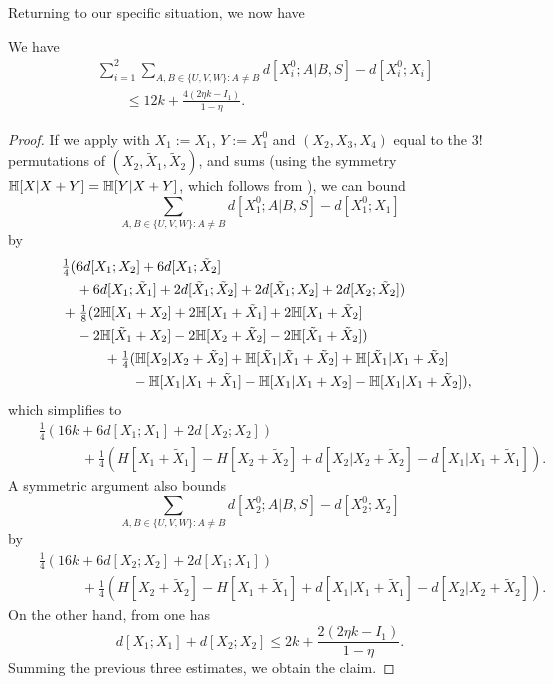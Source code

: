 Returning to our specific situation, we now have

\begin{lemma}\label{dist-diff-bound}\leanok We have
\begin{align*}  &\sum_{i=1}^2 \sum_{A,B \in \{U,V,W\}: A \neq B}  d[X_i^0;A|B, S] - d[X_i^0;X_i]\\
&\qquad \leq 12 k + \frac{4(2 \eta k - I_1)}{1-\eta}.
\end{align*}
\end{lemma}

\begin{proof}\leanok
If we apply  with $X_1:=X_1$, $Y:=X_1^0$ and $(X_2,X_3,X_4)$ equal to the $3!$ permutations of $(X_2,\tilde X_1,\tilde X_2)$, and sums (using the symmetry $\mathbb{H}[X|X+Y] = \mathbb{H}[Y|X+Y]$, which follows from ), we can bound
$$ \sum_{A,B \in \{U,V,W\}: A \neq B}  d[X_1^0;A|B, S] - d[X_1^0;X_1]$$
by
\begin{align*}
  &\quad \tfrac{1}{4} (6d[X_1;X_2] + 6d[X_1;\tilde X_2]\\
  &\qquad + 6d[X_1;\tilde X_1] + 2d[\tilde X_1;\tilde X_2] + 2 d[\tilde X_1;X_2] + 2d[X_2;\tilde X_2])\\
  &\quad + \tfrac{1}{8} (2\mathbb{H}[X_1+X_2] + 2\mathbb{H}[X_1+\tilde X_1] + 2 \mathbb{H}[X_1+\tilde X_2] \\
  &\qquad - 2\mathbb{H}[\tilde X_1+X_2] - 2\mathbb{H}[X_2+\tilde X_2] - 2\mathbb{H}[\tilde X_1+\tilde X_2])\\
  &\qquad \qquad + \tfrac{1}{4} (\mathbb{H}[X_2|X_2+\tilde X_2] + \mathbb{H}[\tilde X_1|\tilde X_1+\tilde X_2] + \mathbb{H}[\tilde X_1|X_1+\tilde X_2] \\
  &\qquad \qquad \qquad - \mathbb{H}[X_1|X_1+\tilde X_1] - \mathbb{H}[X_1|X_1+X_2] - \mathbb{H}[X_1|X_1+\tilde X_2]),
\end{align*}
which simplifies to
\begin{align*}
  &\quad \tfrac{1}{4} (16k + 6d[X_1;X_1] + 2d[X_2;X_2])\\
  &\qquad \qquad + \tfrac{1}{4} (H[X_1+\tilde X_1] - H[X_2+\tilde X_2] + d[X_2|X_2+\tilde X_2] - d[X_1|X_1+\tilde X_1]).
\end{align*}
A symmetric argument also bounds
$$ \sum_{A,B \in \{U,V,W\}: A \neq B}  d[X_2^0;A|B, S] - d[X_2^0;X_2]$$
by
\begin{align*}
  &\quad \tfrac{1}{4} (16k + 6d[X_2;X_2] + 2d[X_1;X_1])\\
  &\qquad \qquad + \tfrac{1}{4} (H[X_2+\tilde X_2] - H[X_1+\tilde X_1] + d[X_1|X_1+\tilde X_1] - d[X_2|X_2+\tilde X_2]).
\end{align*}
On the other hand, from  one has
$$ d[X_1;X_1] + d[X_2;X_2] \leq 2 k + \frac{2(2 \eta k - I_1)}{1-\eta}.$$
Summing the previous three estimates, we obtain the claim.
\end{proof}

